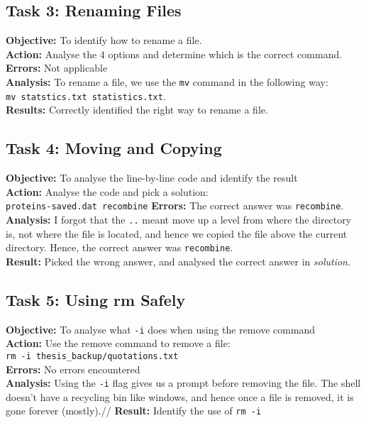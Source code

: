 \documentclass{article}
\begin{document}
\subsection{Task 3: Renaming Files}
%
\textbf{Objective:} To identify how to rename a file.\\
\textbf{Action:} Analyse the 4 options and determine which is the correct command.\\
\textbf{Errors:} Not applicable\\
\textbf{Analysis:} To rename a file, we use the \verb|mv| command in the following way:\\\verb|mv statstics.txt statistics.txt|.\\
\textbf{Results:} Correctly identified the right way to rename a file.
%
\subsection{Task 4: Moving and Copying}
%
\textbf{Objective:} To analyse the line-by-line code and identify the result\\
\textbf{Action:} Analyse the code and pick a solution:\\ \verb|proteins-saved.dat recombine|
\textbf{Errors:} The correct answer was \verb|recombine|.\\
\textbf{Analysis:} I forgot that the \verb|..| meant move up a level from where the directory is, not where the file is located, and hence we copied the file above the current directory. Hence, the correct answer was \verb|recombine|.\\
\textbf{Result:} Picked the wrong answer, and analysed the correct answer in \textit{solution}.
%
\subsection{Task 5: Using rm Safely}
%
\textbf{Objective:} To analyse what \verb|-i| does when using the remove command\\
\textbf{Action:} Use the remove command to remove a file:\\\verb|rm -i thesis_backup/quotations.txt|\\
\textbf{Errors:} No errors encountered\\
\textbf{Analysis:} Using the \verb|-i| flag gives us a prompt before removing the file. The shell doesn't have a recycling bin like windows, and hence once a file is removed, it is gone forever (mostly).//
\textbf{Result:} Identify the use of \verb|rm -i|
%
\end{document}
